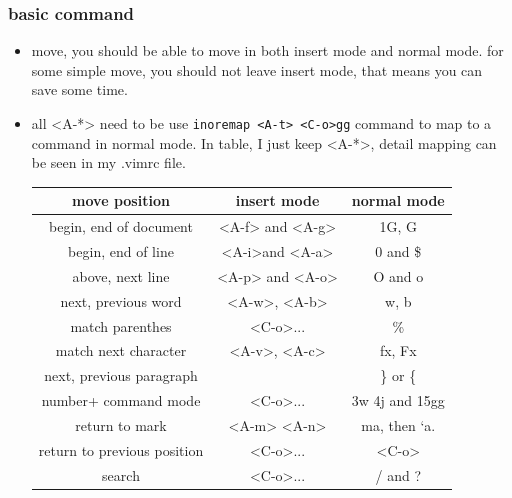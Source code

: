 \documentclass[a4paper,12pt,twoside]{book}
\begin{document}
\subsubsection{basic command}
	\begin{itemize}
	\item move, you should be able to move in both insert mode and normal mode.
        for some simple move, you should not leave insert mode, that means you
        can save some time. 
	\item all <A-*> need to be use \verb!inoremap <A-t> <C-o>gg! command to map to a command in normal mode. In table, I just keep <A-*>, detail mapping can be seen in my .vimrc file. 
	
	\begin{center}
		\begin{tabular}{c|c|c}
		\hline 
        move position & insert mode & normal mode \\

		\hline
		begin, end of document &  <A-f> and <A-g>  & 1G, G  \\
	    \hline 
        begin, end of line &<A-i>and <A-a> & 0 and \$  \\

        \hline 
        above, next line &<A-p> and <A-o> & O and o\\

	   	\hline 		
	     next, previous word &<A-w>, <A-b>  & w, b\\
		
         \hline 		
         match parenthes & <C-o>... & \%   \\
         
         \hline match next character & <A-v>, <A-c>   & fx, Fx \\
         
         \hline next, previous paragraph & & \} or \{ \\

	   	\hline 		
        number+ command mode &<C-o>... &  3w  4j and 15gg  \\
        
        \hline return to mark & <A-m> <A-n> & ma, then `a. \\
        
        \hline return to previous position & <C-o>... & <C-o> \\    
      				
		\hline
        search &<C-o>...  & / and ? \\
        

\end{tabular}
\end{center}
\end{itemize}
\end{document}
